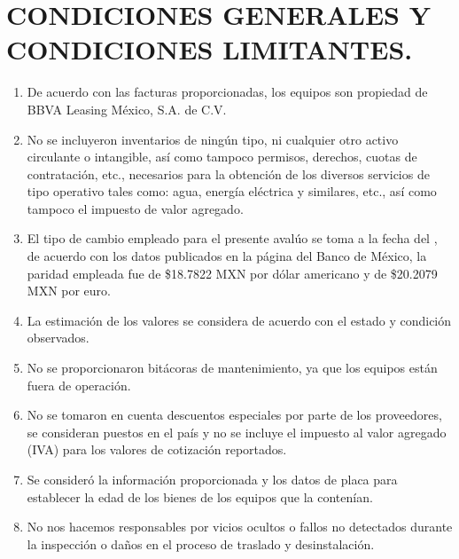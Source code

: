 \chapter{CONDICIONES GENERALES Y CONDICIONES LIMITANTES.} %

\begin{enumerate}
	\item De acuerdo con las facturas proporcionadas, los equipos son propiedad de BBVA Leasing México, S.A. de C.V.
	\item No se incluyeron inventarios de ningún tipo, ni cualquier otro activo circulante o intangible, así como tampoco permisos, derechos, cuotas de contratación, etc., necesarios para la obtención de los diversos servicios de tipo operativo tales como: agua, energía eléctrica y similares, etc., así como tampoco el impuesto de valor agregado.
	\item El tipo de cambio empleado para el presente avalúo se toma a la fecha del \fechaInforme, de acuerdo con los datos publicados en la página del Banco de México, la paridad empleada fue de \$18.7822 MXN por dólar americano y de \$20.2079 MXN por euro.
	\item La estimación de los valores se considera de acuerdo con el estado y condición observados.
	\item No se proporcionaron bitácoras de mantenimiento, ya que los equipos están fuera de operación.
	\item No se tomaron en cuenta descuentos especiales por parte de los proveedores, se consideran puestos en el país y no se incluye el impuesto al valor agregado (IVA) para los valores de cotización reportados.
	\item Se consideró la información proporcionada y los datos de placa para establecer la edad de los bienes de los equipos que la contenían.
	\item No nos hacemos responsables por vicios ocultos o fallos no detectados durante la inspección o daños en el proceso de traslado y desinstalación.
\end{enumerate}

